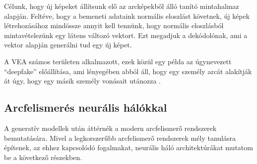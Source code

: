 Célunk, hogy új képeket állítsunk elő az arcképekből álló tanító mintahalmaz alapján. Feltéve, hogy a bemeneti adataink normális eloszlást követnek, új képek létrehozásához mindössze annyit kell tennünk, hogy normális eloszlásból mintavételezünk egy látens változó vektort. Ezt megadjuk a dekódolónak, ami a vektor alapján generálni tud egy új képet.

A VEA számos területen alkalmazott, ezek közül egy példa az úgynevezett ``deepfake'' előállítása, ami lényegében abból áll, hogy egy személy arcát alakítják át úgy, hogy egy másik személy vonásait utánozza \cite{westerlund2019emergence}. 





\subsection{Arcfelismerés neurális hálókkal}

A generatív modellek után áttérnék a modern arcfelismerő rendszerek bemutatására. Mivel a legkorszerűbb arcfelismerő rendszerek mély tanulásra építenek, az ehhez kapcsolódó fogalmakat, neurális háló architektúrákat mutatom be a következő részekben.

